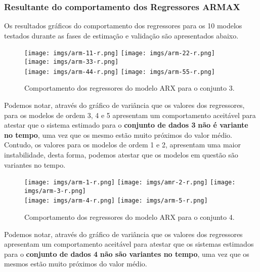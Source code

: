 \documentclass[a4paper,12pt]{article}
\begin{document}
\subsubsection{Resultante do comportamento dos Regressores ARMAX}

Os resultados gráficos do comportamento dos regressores para os 10 modelos testados durante as fases de estimação e validação são apresentados abaixo.
\begin{figure}[h!]
\centering

\texttt{[image: imgs/arm-11-r.png]} \quad
\texttt{[image: imgs/arm-22-r.png]} \quad
\texttt{[image: imgs/arm-33-r.png]} \\

\texttt{[image: imgs/arm-44-r.png]} \quad
\texttt{[image: imgs/arm-55-r.png]}

\caption{Comportamento dos regressores do modelo ARX para o conjunto 3.}
\end{figure}

Podemos notar, através do gráfico de variância que os valores dos regressores, para os modelos de ordem 3, 4 e 5 apresentam um comportamento aceitável para atestar que o sistema estimado para o \textbf{conjunto de dados 3} \textbf{não é variante no tempo}, uma vez que os mesmo estão muito próximos do valor médio. Contudo, os valores para os modelos de ordem 1 e 2, apresentam uma maior instabilidade, desta forma, podemos atestar que os modelos em questão são variantes no tempo.

\begin{figure}[h!]
\centering

\texttt{[image: imgs/arm-1-r.png]} \quad
\texttt{[image: imgs/amr-2-r.png]} \quad
\texttt{[image: imgs/arm-3-r.png]} \\

\texttt{[image: imgs/arm-4-r.png]} \quad
\texttt{[image: imgs/arm-5-r.png]}

\caption{Comportamento dos regressores do modelo ARX para o conjunto 4.}
\end{figure}

Podemos notar, através do gráfico de variância que os valores dos regressores apresentam um comportamento aceitável para atestar que os sistemas estimados para o \textbf{conjunto de dados 4} \textbf{não são variantes no tempo}, uma vez que os mesmos estão muito próximos do valor médio.
\end{document}
